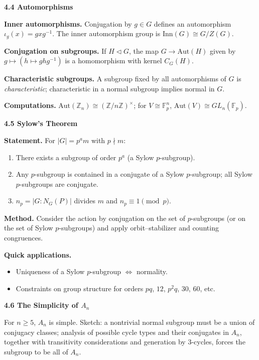 \documentclass[11pt]{article}
\theoremstyle{definition}
\newcommand{\Aut}{\mathrm{Aut}}
\newcommand{\Inn}{\mathrm{Inn}}
\begin{document}
\newpage

\textbf{4.4 Automorphisms}

\medskip
\textbf{Inner automorphisms.} Conjugation by $g\in G$ defines an automorphism $\iota_g(x)=gxg^{-1}$. The inner automorphism group is $\Inn(G)\cong G/Z(G)$.

\medskip
\textbf{Conjugation on subgroups.} If $H\lhd G$, the map $G\to\Aut(H)$ given by $g\mapsto (h\mapsto ghg^{-1})$ is a homomorphism with kernel $C_G(H)$.

\medskip
\textbf{Characteristic subgroups.} A subgroup fixed by all automorphisms of $G$ is \emph{characteristic}; characteristic in a normal subgroup implies normal in $G$.

\medskip
\textbf{Computations.} $\Aut(\mathbb{Z}_n)\cong (\mathbb{Z}/n\mathbb{Z})^\times$; for $V\cong \mathbb{F}_p^n$, $\Aut(V)\cong GL_n(\mathbb{F}_p)$.

\newpage

\textbf{4.5 Sylow’s Theorem}

\medskip
\textbf{Statement.} For $|G|=p^a m$ with $p\nmid m$:
\begin{enumerate}\itemsep3pt
\item There exists a subgroup of order $p^a$ (a Sylow $p$-subgroup).
\item Any $p$-subgroup is contained in a conjugate of a Sylow $p$-subgroup; all Sylow $p$-subgroups are conjugate.
\item $n_p=|G:N_G(P)|$ divides $m$ and $n_p\equiv 1\pmod p$.
\end{enumerate}

\medskip
\textbf{Method.} Consider the action by conjugation on the set of $p$-subgroups (or on the set of Sylow $p$-subgroups) and apply orbit--stabilizer and counting congruences.

\medskip
\textbf{Quick applications.}
\begin{itemize}\itemsep3pt
\item Uniqueness of a Sylow $p$-subgroup $\Longleftrightarrow$ normality.
\item Constraints on group structure for orders $pq$, $12$, $p^2q$, $30$, $60$, etc.
\end{itemize}

\newpage

\textbf{4.6 The Simplicity of $A_n$}

\medskip
For $n\ge 5$, $A_n$ is simple. Sketch: a nontrivial normal subgroup must be a union of conjugacy classes; analysis of possible cycle types and their conjugates in $A_n$, together with transitivity considerations and generation by $3$-cycles, forces the subgroup to be all of $A_n$.
\end{document}
